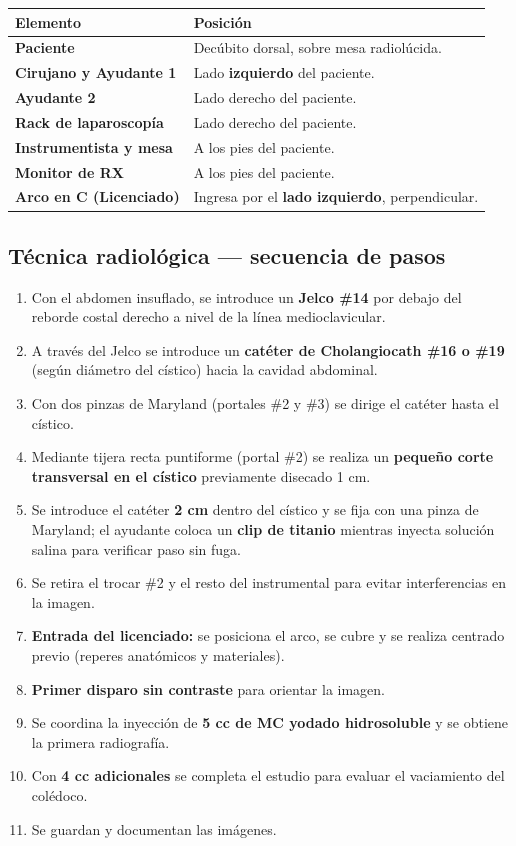{\renewcommand{\arraystretch}{1.25}
	\begin{center}
		\begin{tabular}{>{\bfseries}p{4cm} p{9.5cm}}
			\hline
			Elemento & Posición \\
			\hline
			Paciente & Decúbito dorsal, sobre mesa radiolúcida. \\[0.3em]
			\hline
			Cirujano y Ayudante 1 & Lado \textbf{izquierdo} del paciente. \\[0.3em]
			\hline
			Ayudante 2 & Lado derecho del paciente. \\[0.3em]
			\hline
			Rack de laparoscopía & Lado derecho del paciente. \\[0.3em]
			\hline
			Instrumentista y mesa & A los pies del paciente. \\[0.3em]
			\hline
			Monitor de RX & A los pies del paciente. \\[0.3em]
			\hline
			Arco en C (Licenciado) & Ingresa por el \textbf{lado izquierdo}, perpendicular. \\
			\hline
		\end{tabular}
	\end{center}
}

\subsection*{Técnica radiológica --- secuencia de pasos}

\begin{enumerate}[noitemsep]
	\item Con el abdomen insuflado, se introduce un \textbf{Jelco \#14} por debajo del reborde costal derecho a nivel de la línea medioclavicular.
	\item A través del Jelco se introduce un \textbf{catéter de Cholangiocath \#16 o \#19} (según diámetro del cístico) hacia la cavidad abdominal.
	\item Con dos pinzas de Maryland (portales \#2 y \#3) se dirige el catéter hasta el cístico.
	\item Mediante tijera recta puntiforme (portal \#2) se realiza un \textbf{pequeño corte transversal en el cístico} previamente disecado 1 cm.
	\item Se introduce el catéter \textbf{2 cm} dentro del cístico y se fija con una pinza de Maryland; el ayudante coloca un \textbf{clip de titanio} mientras inyecta solución salina para verificar paso sin fuga.
	\item Se retira el trocar \#2 y el resto del instrumental para evitar interferencias en la imagen.
	\item \textbf{Entrada del licenciado:} se posiciona el arco, se cubre y se realiza centrado previo (reperes anatómicos y materiales).
	\item \textbf{Primer disparo sin contraste} para orientar la imagen.
	\item Se coordina la inyección de \textbf{5 cc de MC yodado hidrosoluble} y se obtiene la primera radiografía.
	\item Con \textbf{4 cc adicionales} se completa el estudio para evaluar el vaciamiento del colédoco.
	\item Se guardan y documentan las imágenes.
\end{enumerate}

